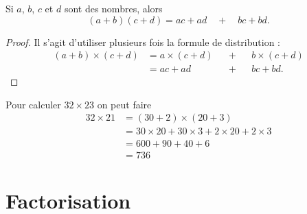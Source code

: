 

\begin{propriete}
    Si \( a\), \( b\), \( c\) et \( d\) sont des nombres, alors
    \begin{equation}
        (a+b)(c+d)=ac+ad\quad+\quad bc+bd.
    \end{equation}
\end{propriete}

\begin{proof}
    Il s'agit d'utiliser plusieurs fois la formule de distribution :
    \begin{subequations}
        \begin{align}
            (a+b)\times \boxed{(c+d)}&=a\times \boxed{(c+d)}&&+&& b\times \boxed{(c+d)}\\
            &=ac+ad  &&+&&bc+bd.
        \end{align}
    \end{subequations}
\end{proof}

\begin{example}
    Pour calculer \( 32\times 23 \) on peut faire
    \begin{subequations}
        \begin{align}
                32\times 21&=(30+2)\times (20+3)\\
                &=30\times 20+30\times 3+2\times 20+2\times 3\\
                &=600+90+40+6\\
                &=736
        \end{align}
    \end{subequations}
\end{example}


\section{Factorisation}



